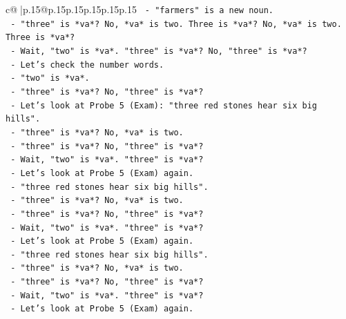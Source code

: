 \documentclass{article}
\begin{document}
{\begin{supertabular}{c@{$\;$}|p{.15\linewidth}@{}p{.15\linewidth}p{.15\linewidth}p{.15\linewidth}p{.15\linewidth}p{.15\linewidth}}
{{{\texttt{                                {-} "farmers" is a new noun.} \\
\texttt{                                {-} "three" is *va*? No, *va* is two. Three is *va*? No, *va* is two. Three is *va*?} \\
\texttt{                                {-} Wait, "two" is *va*. "three" is *va*? No, "three" is *va*?} \\
\texttt{                                {-} Let's check the number words.} \\
\texttt{                                {-} "two" is *va*.} \\
\texttt{                                {-} "three" is *va*? No, "three" is *va*?} \\
\texttt{                                {-} Let's look at Probe 5 (Exam): "three red stones hear six big hills".} \\
\texttt{                                {-} "three" is *va*? No, *va* is two.} \\
\texttt{                                {-} "three" is *va*? No, "three" is *va*?} \\
\texttt{                                {-} Wait, "two" is *va*. "three" is *va*?} \\
\texttt{                                {-} Let's look at Probe 5 (Exam) again.} \\
\texttt{                                {-} "three red stones hear six big hills".} \\
\texttt{                                {-} "three" is *va*? No, *va* is two.} \\
\texttt{                                {-} "three" is *va*? No, "three" is *va*?} \\
\texttt{                                {-} Wait, "two" is *va*. "three" is *va*?} \\
\texttt{                                {-} Let's look at Probe 5 (Exam) again.} \\
\texttt{                                {-} "three red stones hear six big hills".} \\
\texttt{                                {-} "three" is *va*? No, *va* is two.} \\
\texttt{                                {-} "three" is *va*? No, "three" is *va*?} \\
\texttt{                                {-} Wait, "two" is *va*. "three" is *va*?} \\
\texttt{                                {-} Let's look at Probe 5 (Exam) again.} \\
}}}
\end{supertabular}}
\end{document}
